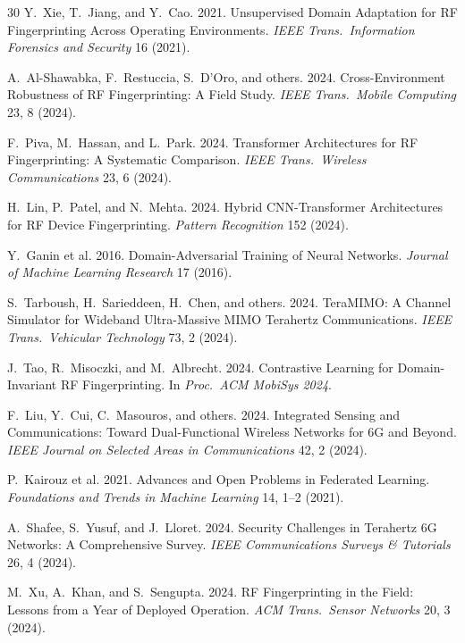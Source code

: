 \documentclass[sigconf,nonacm]{acmart}
\begin{document}
\begin{thebibliography}{30}
Y.~Xie, T.~Jiang, and Y.~Cao. 2021. Unsupervised Domain Adaptation
for RF Fingerprinting Across Operating Environments.
\textit{IEEE Trans.\ Information Forensics and Security} 16 (2021).

A.~Al-Shawabka, F.~Restuccia, S.~D'Oro, and others. 2024.
Cross-Environment Robustness of RF Fingerprinting: A Field Study.
\textit{IEEE Trans.\ Mobile Computing} 23, 8 (2024).

F.~Piva, M.~Hassan, and L.~Park. 2024. Transformer Architectures
for RF Fingerprinting: A Systematic Comparison.
\textit{IEEE Trans.\ Wireless Communications} 23, 6 (2024).

H.~Lin, P.~Patel, and N.~Mehta. 2024. Hybrid CNN-Transformer
Architectures for RF Device Fingerprinting.
\textit{Pattern Recognition} 152 (2024).

Y.~Ganin et al. 2016. Domain-Adversarial Training of Neural
Networks. \textit{Journal of Machine Learning Research} 17 (2016).

S.~Tarboush, H.~Sarieddeen, H.~Chen, and others. 2024. TeraMIMO:
A Channel Simulator for Wideband Ultra-Massive MIMO Terahertz
Communications. \textit{IEEE Trans.\ Vehicular Technology} 73,
2 (2024).

J.~Tao, R.~Misoczki, and M.~Albrecht. 2024. Contrastive Learning
for Domain-Invariant RF Fingerprinting. In \textit{Proc.\ ACM
MobiSys 2024}.

F.~Liu, Y.~Cui, C.~Masouros, and others. 2024. Integrated Sensing
and Communications: Toward Dual-Functional Wireless Networks for
6G and Beyond. \textit{IEEE Journal on Selected Areas in
Communications} 42, 2 (2024).

P.~Kairouz et al. 2021. Advances and Open Problems in Federated
Learning. \textit{Foundations and Trends in Machine Learning} 14,
1--2 (2021).

A.~Shafee, S.~Yusuf, and J.~Lloret. 2024. Security Challenges in
Terahertz 6G Networks: A Comprehensive Survey.
\textit{IEEE Communications Surveys \& Tutorials} 26, 4 (2024).

M.~Xu, A.~Khan, and S.~Sengupta. 2024. RF Fingerprinting in the
Field: Lessons from a Year of Deployed Operation.
\textit{ACM Trans.\ Sensor Networks} 20, 3 (2024).


\end{thebibliography}
\end{document}
